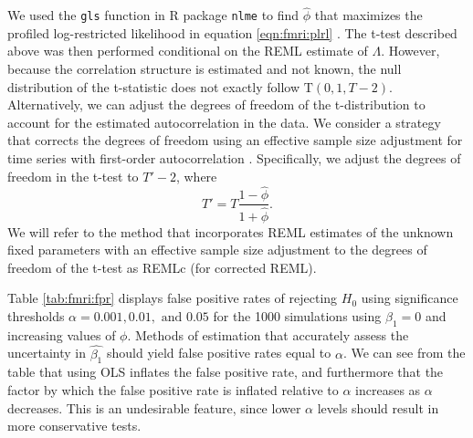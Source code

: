 We used the {\tt gls} function in R package {\tt nlme} to find $\hat{\phi}$ that maximizes the profiled log-restricted likelihood in equation \eqref{eqn:fmri:plrl} \citep{pin:bates:mixed:2000}. The t-test described above was then performed conditional on the REML estimate of $\Lambda$. However, because the correlation structure is estimated and not known, the null distribution of the t-statistic does not exactly follow $\mbox{T}(0,1,T-2)$. Alternatively, we can adjust the degrees of freedom of the t-distribution to account for the estimated autocorrelation in the data. We consider a strategy that corrects the degrees of freedom using an effective sample size adjustment for time series with first-order autocorrelation \citep{dawdy:matalas:ess:1964}. Specifically, we adjust the degrees of freedom in the t-test to $T' - 2$, where
\begin{equation}
T' = T\frac{1-\hat{\phi}}{1+\hat{\phi}}. \label{eqn:fmri:ess}
\end{equation}
We will refer to the method that incorporates REML estimates of the unknown fixed parameters with an effective sample size adjustment to the degrees of freedom of the t-test as REMLc (for corrected REML).

Table \ref{tab:fmri:fpr} displays false positive rates of rejecting $H_0$ using significance thresholds $\alpha = 0.001, 0.01, \mbox{ and } 0.05$ for the 1000 simulations using $\beta_1 = 0$ and increasing values of $\phi$. Methods of estimation that accurately assess the uncertainty in $\hat{\beta_1}$ should yield false positive rates equal to $\alpha$. We can see from the table that using OLS inflates the false positive rate, and furthermore that the factor by which the false positive rate is inflated relative to $\alpha$ increases as $\alpha$ decreases. This is an undesirable feature, since lower $\alpha$ levels should result in more conservative tests.

